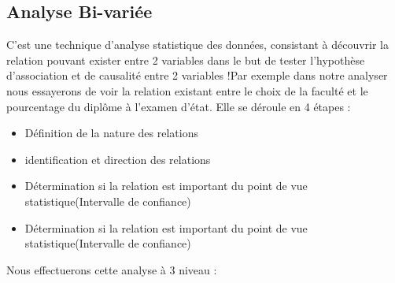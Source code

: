 \subsection{Analyse Bi-variée}
C'est une technique d'analyse statistique des données, consistant à
découvrir la relation pouvant exister entre 2 variables dans le but de
tester l'hypothèse d'association et de causalité entre 2 variables !Par
exemple dans notre analyser nous essayerons de voir la relation
existant entre le choix de la faculté et le pourcentage du diplôme à l'examen d'état. Elle se déroule en 4 étapes : \cite{becker2011uncertainty}
\begin{itemize}
	\item Définition de la nature des relations
	\item  identification et direction des relations 
	\item   Détermination si
	la relation est important du point de vue statistique(Intervalle de
	confiance)
	\item  Détermination si
	la relation est important du point de vue statistique(Intervalle de
	confiance)
\end{itemize}
Nous effectuerons cette analyse à 3 niveau :
